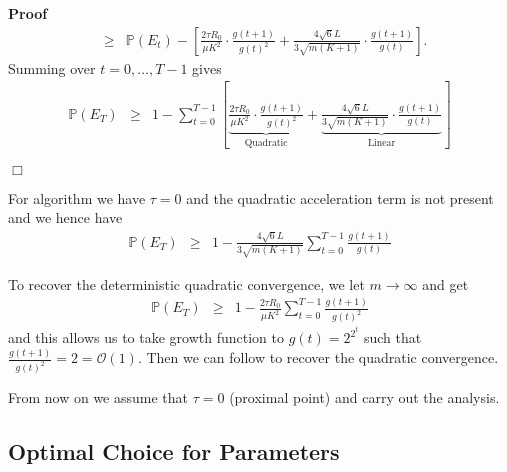 \documentclass{article}
\newcommand{\cdummy}{\cdot}
\newcommand{\tmverbatim}[1]{\text{{\ttfamily{#1}}}}
\newenvironment{proof}{\noindent\textbf{Proof\ }}{\hspace*{\fill}$\Box$\medskip}
\begin{document}
\begin{proof}
\begin{eqnarray*}
    & \geq & \mathbb{P} (E_t) - \left[ \frac{2 \tau R_0}{\mu K^2} \cdummy
    \frac{g (t + 1)}{g (t)^2} + \frac{4 \sqrt{6} L}{3 \sqrt{m (K + 1)}}
    \cdummy \frac{g (t + 1)}{g (t)} \right] .
  \end{eqnarray*}
  Summing over $t = 0, \ldots, T - 1$ gives
  \begin{eqnarray*}
    \mathbb{P} (E_T) & \geq & 1 - \sum_{t = 0}^{T - 1} \left[
    \underbrace{\frac{2 \tau R_0}{\mu K^2} \cdummy \frac{g (t + 1)}{g
    (t)^2}}_{\text{Quadratic}} + \underbrace{\frac{4 \sqrt{6} L}{3 \sqrt{m (K
    + 1)}} \cdummy \frac{g (t + 1)}{g (t)}}_{\text{Linear}} \right]
  \end{eqnarray*}
  
\end{proof}

\begin{remark}
  For \tmverbatim{SPP} algorithm we have $\tau = 0$ and the quadratic
  acceleration term is not present and we hence have
  \begin{eqnarray*}
    \mathbb{P} (E_T) & \geq & 1 - \frac{4 \sqrt{6} L}{3 \sqrt{m (K + 1)}}
    \sum_{t = 0}^{T - 1} \frac{g (t + 1)}{g (t)}
  \end{eqnarray*}
\end{remark}

\begin{remark}
  To recover the deterministic quadratic convergence, we let $m \rightarrow
  \infty$ and get
  \begin{eqnarray*}
    \mathbb{P} (E_T) & \geq & 1 - \frac{2 \tau R_0}{\mu K^2} \sum_{t = 0}^{T -
    1} \frac{g (t + 1)}{g (t)^2}
  \end{eqnarray*}
  and this allows us to take growth function to $g (t) = 2^{2^t}$ such that
  $\frac{g (t + 1)}{g (t)^2} = 2 =\mathcal{O} (1)$. Then we can follow
  \cite{davis2019stochastic} to recover the quadratic convergence.
\end{remark}

\newpage

From now on we assume that $\tau = 0$ (proximal point) and carry out the analysis.\\
 
\subsection{Optimal Choice for Parameters}
\end{document}
